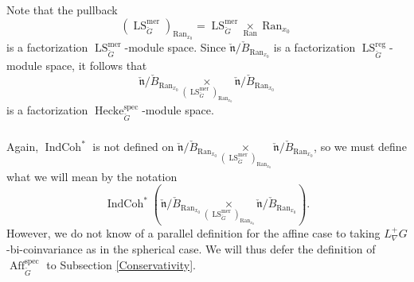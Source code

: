 \documentclass[10pt]{amsart}
\theoremstyle{remark}
\newtheorem{rem}[subsubsection]{Remark}
\newcommand{\on}[1]{\operatorname{#1}}
\newcommand{\QCoh}{\on{QCoh}}
\newcommand{\IndCoh}{\on{IndCoh}}
\newcommand{\Gcheck}{\check{G}}
\newcommand{\ncheck}{\check{\mathfrak{n}}}
\newcommand{\Bcheck}{\check{B}}
\newcommand{\Ran}{\on{Ran}}
\newcommand{\sssec}[1]{\subsubsection{}}
\begin{document}

\sssec{}
Note that the pullback
$$
(\on{LS}_{\Gcheck}^{\on{mer}})_{\Ran_{x_0}} = \on{LS}_{\Gcheck}^{\on{mer}} \underset{\Ran}{\times} \Ran_{x_0}
$$
is a factorization $\on{LS}_{\Gcheck}^{\on{mer}}$-module space. Since $\ncheck/\Bcheck_{\Ran_{x_0}}$ is a factorization $\on{LS}_{\Gcheck}^{\on{reg}}$-module space, it follows that 
$$
\ncheck/\Bcheck_{\Ran_{x_0}} \underset{(\on{LS}_{\Gcheck}^{\on{mer}})_{\Ran_{x_0}}}{\times} \ncheck/\Bcheck_{\Ran_{x_0}}
$$
is a factorization $\on{Hecke}_{\Gcheck}^{\on{spec}}$-module space.

\sssec{}
Again, $\IndCoh^*$ is not defined on $\ncheck/\Bcheck_{\Ran_{x_0}} \underset{(\on{LS}_{\Gcheck}^{\on{mer}})_{\Ran_{x_0}}}{\times} \ncheck/\Bcheck_{\Ran_{x_0}}$, so we must define what we will mean by the notation 
$$
\IndCoh^*(\ncheck/\Bcheck_{\Ran_{x_0}} \underset{(\on{LS}_{\Gcheck}^{\on{mer}})_{\Ran_{x_0}}}{\times} \ncheck/\Bcheck_{\Ran_{x_0}}).
$$
However, we do not know of a parallel definition for the affine case to taking $L_{\nabla}^+G$-bi-coinvariance as in the spherical case. We will thus defer the definition of $\on{Aff}_{\Gcheck}^{\on{spec}}$ to Subsection \ref{Conservativity}.

\end{document}
